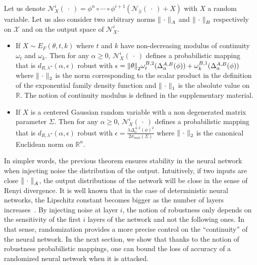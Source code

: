 \begin{theorem}
\label{theorem:ap2-netrob}
Let us denote $\mathcal{N}_{X}^i(\ \cdot\ ) = \phi^n\circ \cdots \circ\phi^{i+1}(\mathcal{N}_{|i}(\ \cdot\ )+X)$ with $X$ a random variable.
Let us also consider two arbitrary norms $\norm{\ \cdot\ }_{A}$ and $\norm{\ \cdot\ }_{B}$  respectively on $\mathcal{X}$ and on the output space of $\mathcal{N}_{X}^i$.

\begin{itemize}
  \item If $X\sim E_{F}(\theta,t,k)$ where $t$ and $k$ have non-decreasing modulus of continuity $\omega_t$ and $\omega_k$.
  Then for any $\alpha \geq 0$, $\mathcal{N}_{X}^i(\ \cdot\ )$ defines a probabilistic mapping that is $d_{R,\lambda}$-$(\alpha,\epsilon)$ robust with $\epsilon = \norm{\theta}_2 \omega^{B,2}_t(\Delta^{A,B}_{\alpha}(\phi)) +\omega_k^{B,1}(\Delta^{A,B}_{\alpha}(\phi)) $ where $\norm{\ \cdot\ }_2$ is the norm corresponding to the scalar product in the definition of the exponential family density function and $\norm{\ \cdot\ }_1$ is the absolute value on $\mathbb{R}$.
  The notion of continuity modulus is defined in the supplementary material.
    
  \item If $X$ is a centered Gaussian random variable with a non degenerated matrix parameter $\Sigma$.
    Then for any $\alpha \geq 0$, $\mathcal{N}_{X}^i(\ \cdot\ )$ defines a probabilistic mapping that is $d_{R,\lambda}$-$(\alpha,\epsilon)$ robust with $ \epsilon = \frac{\lambda \Delta^{A,2}_{\alpha}(\phi)^2 }{2 \sigma_{min}(\Sigma) } $ where $\norm{\ \cdot\ }_2$ is the canonical Euclidean norm on $\mathbb{R}^n$.
\end{itemize}
\end{theorem}

In simpler words, the previous theorem ensures stability in the neural network when injecting noise \wrt the distribution of the output.
Intuitively, if two inputs are close \wrt $\norm{\ \cdot\ }_{A}$, the output distributions of the network will be close in the sense of Renyi divergence.
It is well known that in the case of deterministic neural networks, the Lipschitz constant becomes bigger as the number of layers increases~\cite{gouk2018regularisation}.
By injecting noise at layer $i$, the notion of robustness only depends on the sensitivity of the first $i$ layers of the network and not the following ones.
In that sense, randomization provides a more precise control on the ``continuity'' of the neural network.
In the next section, we show that thanks to the notion of robustness \wrt probabilistic mappings, one can bound the loss of accuracy of a randomized neural network when it is attacked. 

